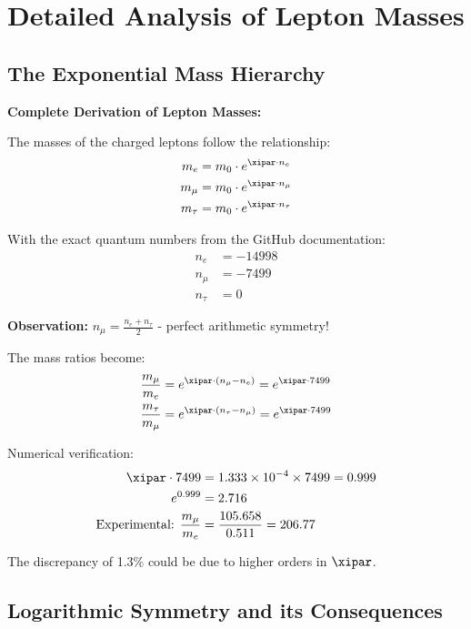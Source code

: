 	\section{Detailed Analysis of Lepton Masses}
	
	\subsection{The Exponential Mass Hierarchy}
	
	\begin{relation}
		\textbf{Complete Derivation of Lepton Masses:}
		
		The masses of the charged leptons follow the relationship:
		\begin{align}
			m_e &= m_0 \cdot e^{\xipar \cdot n_e} \\
			m_\mu &= m_0 \cdot e^{\xipar \cdot n_\mu} \\
			m_\tau &= m_0 \cdot e^{\xipar \cdot n_\tau}
		\end{align}
		
		With the exact quantum numbers from the GitHub documentation:
		\begin{align}
			n_e &= -14998 \\
			n_\mu &= -7499 \\
			n_\tau &= 0
		\end{align}
		
		\textbf{Observation:} $n_\mu = \frac{n_e + n_\tau}{2}$ - perfect arithmetic symmetry!
		
		The mass ratios become:
		\begin{align}
			\frac{m_\mu}{m_e} &= e^{\xipar \cdot (n_\mu - n_e)} = e^{\xipar \cdot 7499} \\
			\frac{m_\tau}{m_\mu} &= e^{\xipar \cdot (n_\tau - n_\mu)} = e^{\xipar \cdot 7499}
		\end{align}
		
		Numerical verification:
		\begin{align}
			\xipar \cdot 7499 &= 1.333 \times 10^{-4} \times 7499 = 0.999 \\
			e^{0.999} &= 2.716 \\
			\text{Experimental: } \frac{m_\mu}{m_e} &= \frac{105.658}{0.511} = 206.77
		\end{align}
		
		The discrepancy of 1.3\% could be due to higher orders in $\xipar$.
	\end{relation}
	
	\subsection{Logarithmic Symmetry and its Consequences}
	
